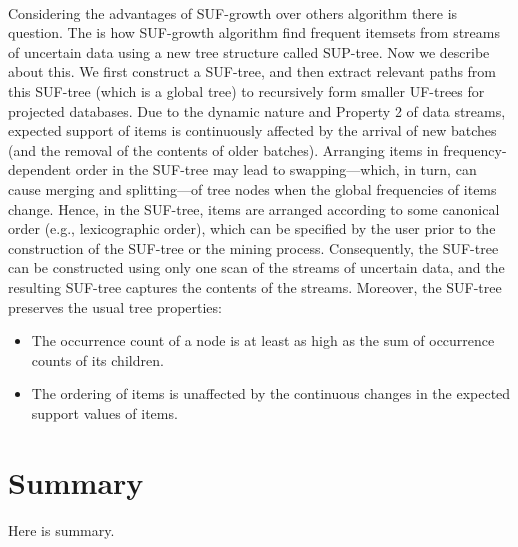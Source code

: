 \paragraph{}
Considering the advantages of SUF-growth over others algorithm there is question. The is how SUF-growth algorithm find frequent itemsets from streams of uncertain data using a new tree structure called SUP-tree. Now we describe about this. We ﬁrst construct a SUF-tree, and then extract relevant paths from this SUF-tree (which is a global tree) to recursively form smaller UF-trees for projected databases. Due to the dynamic nature and Property 2 of data streams, expected support of items is continuously affected by the arrival of new batches (and the removal of the contents of older batches). Arranging items in frequency-dependent order in the SUF-tree may lead to swapping—which, in turn, can cause merging and splitting—of tree nodes when the global frequencies of items change. Hence, in the SUF-tree, items are arranged according to some canonical order (e.g., lexicographic order), which can be speciﬁed by the user prior to the construction of the SUF-tree or the mining process. Consequently, the SUF-tree can be constructed using only one scan of the streams of uncertain data, and the resulting SUF-tree captures the contents of the streams. Moreover, the SUF-tree preserves the usual tree properties:
\begin{itemize}
 \item  The occurrence count of a node is at least as high as the sum of occurrence counts of its children.
  \item The ordering of items is unaffected by the continuous changes in the expected support values of items.
 
\end{itemize}

\section{Summary}
Here is summary.

%